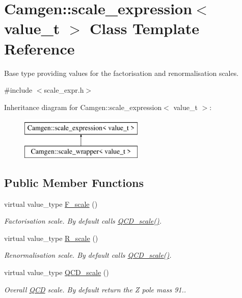 \hypertarget{a00489}{\section{Camgen\-:\-:scale\-\_\-expression$<$ value\-\_\-t $>$ Class Template Reference}
\label{a00489}
}


Base type providing values for the factorisation and renormalisation scales.  




{\ttfamily \#include $<$scale\-\_\-expr.\-h$>$}

Inheritance diagram for Camgen\-:\-:scale\-\_\-expression$<$ value\-\_\-t $>$\-:\begin{figure}[H]
\begin{center}
\leavevmode
\includegraphics[height=2.000000cm]{a00489}
\end{center}
\end{figure}
\subsection*{Public Member Functions}
\begin{DoxyCompactItemize}
\item 
\hypertarget{a00489_ae3e82d7b19e12aa8649fb97a5ae6e5ea}{virtual value\-\_\-type \hyperlink{a00489_ae3e82d7b19e12aa8649fb97a5ae6e5ea}{F\-\_\-scale} ()}\label{a00489_ae3e82d7b19e12aa8649fb97a5ae6e5ea}

\begin{DoxyCompactList}\small\item\em Factorisation scale. By default calls \hyperlink{a00489_aabc64b8eb844ec306c52f315770e9027}{Q\-C\-D\-\_\-scale()}. \end{DoxyCompactList}\item 
\hypertarget{a00489_a1f22c679e4695925cb84c145c91761c2}{virtual value\-\_\-type \hyperlink{a00489_a1f22c679e4695925cb84c145c91761c2}{R\-\_\-scale} ()}\label{a00489_a1f22c679e4695925cb84c145c91761c2}

\begin{DoxyCompactList}\small\item\em Renormalisation scale. By default calls \hyperlink{a00489_aabc64b8eb844ec306c52f315770e9027}{Q\-C\-D\-\_\-scale()}. \end{DoxyCompactList}\item 
\hypertarget{a00489_aabc64b8eb844ec306c52f315770e9027}{virtual value\-\_\-type \hyperlink{a00489_aabc64b8eb844ec306c52f315770e9027}{Q\-C\-D\-\_\-scale} ()}\label{a00489_aabc64b8eb844ec306c52f315770e9027}

\begin{DoxyCompactList}\small\item\em Overall \hyperlink{a00449}{Q\-C\-D} scale. By default return the Z pole mass 91.. \end{DoxyCompactList}\end{DoxyCompactItemize}


